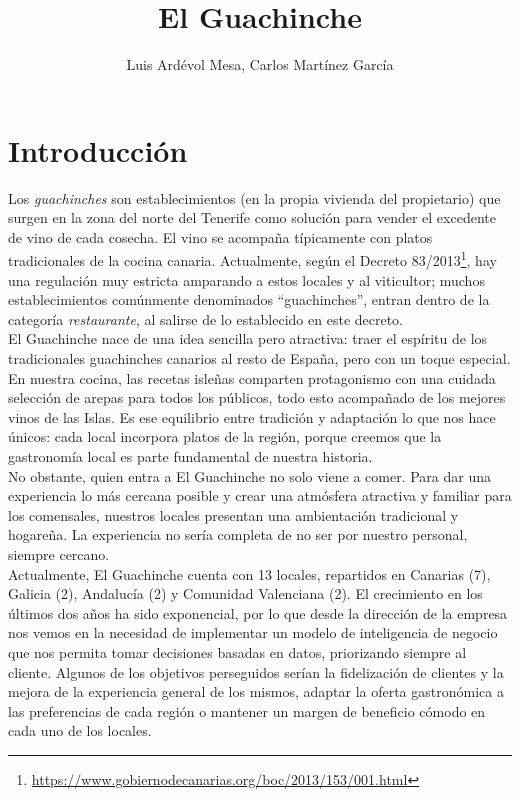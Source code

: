 \documentclass[12pt]{opticajnl}
\title{El Guachinche}
\author[1,2,3]{Luis Ardévol Mesa, Carlos Martínez García}
\begin{document}
\maketitle

\section{Introducción}


Los \textit{guachinches} son establecimientos (en la propia vivienda del propietario) que surgen en la zona del norte del Tenerife como solución para vender el excedente de vino de cada cosecha. El vino se acompaña típicamente con platos tradicionales de la cocina canaria. Actualmente, según el Decreto 83/2013\footnote{\url{https://www.gobiernodecanarias.org/boc/2013/153/001.html}}, hay una regulación muy estricta amparando a estos locales y al viticultor; muchos establecimientos comúnmente denominados ``guachinches'', entran dentro de la categoría \textit{restaurante}, al salirse de lo establecido en este decreto. \\

El Guachinche nace de una idea sencilla pero atractiva: traer el espíritu de los tradicionales guachinches canarios al resto de España, pero con un toque especial. En nuestra cocina, las recetas isleñas comparten protagonismo con una cuidada selección de arepas para todos los públicos, todo esto acompañado de los mejores vinos de las Islas. Es ese equilibrio entre tradición y adaptación lo que nos hace únicos: cada local incorpora platos de la región, porque creemos que la gastronomía local es parte fundamental de nuestra historia. \\

No obstante, quien entra a El Guachinche no solo viene a comer. Para dar una experiencia lo más cercana posible y crear una atmósfera atractiva y familiar para los comensales, nuestros locales presentan una ambientación tradicional y hogareña. La experiencia no sería completa de no ser por nuestro personal, siempre cercano. \\

Actualmente, El Guachinche cuenta con 13 locales, repartidos en Canarias (7), Galicia (2), Andalucía (2) y Comunidad Valenciana (2). El crecimiento en los últimos dos años ha sido exponencial, por lo que desde la dirección de la empresa nos vemos en la necesidad de implementar un modelo de inteligencia de negocio que nos permita tomar decisiones basadas en datos, priorizando siempre al cliente. Algunos de los objetivos perseguidos serían la fidelización de clientes y la mejora de la experiencia general de los mismos, adaptar la oferta gastronómica a las preferencias de cada región o mantener un margen de beneficio cómodo en cada uno de los locales. \\
\end{document}
